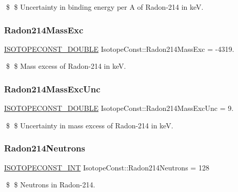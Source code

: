 \$ \$ Uncertainty in binding energy per A of Radon-\/214 in keV. \mbox{\label{group___isotope_const-_radon-_rn214_gab5700a710cd77de3ed601241f713d734}} 
\subsubsection{\texorpdfstring{Radon214\+Mass\+Exc}{Radon214MassExc}}
{\footnotesize\ttfamily \mbox{\hyperlink{group___isotope_const-_macros_ga8f45a7272ce02c0b4c65c44636ed719a}{I\+S\+O\+T\+O\+P\+E\+C\+O\+N\+S\+T\+\_\+\+D\+O\+U\+B\+LE}} Isotope\+Const\+::\+Radon214\+Mass\+Exc = -\/4319.}

\$ \$ Mass excess of Radon-\/214 in keV. \mbox{\label{group___isotope_const-_radon-_rn214_gad2bd698836fd0d7080dba80bee629573}} 
\subsubsection{\texorpdfstring{Radon214\+Mass\+Exc\+Unc}{Radon214MassExcUnc}}
{\footnotesize\ttfamily \mbox{\hyperlink{group___isotope_const-_macros_ga8f45a7272ce02c0b4c65c44636ed719a}{I\+S\+O\+T\+O\+P\+E\+C\+O\+N\+S\+T\+\_\+\+D\+O\+U\+B\+LE}} Isotope\+Const\+::\+Radon214\+Mass\+Exc\+Unc = 9.}

\$ \$ Uncertainty in mass excess of Radon-\/214 in keV. \mbox{\label{group___isotope_const-_radon-_rn214_ga30a0ff29418e56f3d8c13c5e159bc6cf}} 
\subsubsection{\texorpdfstring{Radon214\+Neutrons}{Radon214Neutrons}}
{\footnotesize\ttfamily \mbox{\hyperlink{group___isotope_const-_macros_ga5f18360b3e99483a35c32d789e62621c}{I\+S\+O\+T\+O\+P\+E\+C\+O\+N\+S\+T\+\_\+\+I\+NT}} Isotope\+Const\+::\+Radon214\+Neutrons = 128}

\$ \$ Neutrons in Radon-\/214. \mbox{\label{group___isotope_const-_radon-_rn214_ga7bb94390235652745711a8b4e6523457}} 
